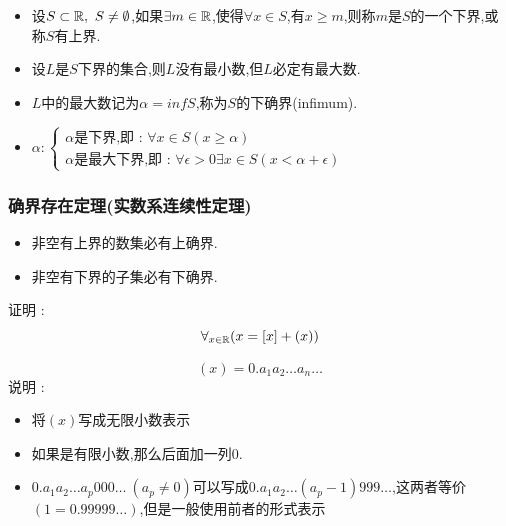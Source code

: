 {{{{\begin{itemize}
{              \begin{itemize}
                  \item 设$S \subset \operatorname{\mathbb{R}},\ S \neq \emptyset$,如果$\exists m \in \operatorname{\mathbb{R}}$,使得$\forall x \in S$,有$x \geq m$,则称$m$是$S$的一个下界,或称$S$有上界.
                  \item 设$L$是$S$下界的集合,则$L$没有最小数,但$L$必定有最大数.
                  \item $L$中的最大数记为$\alpha = inf S$,称为$S$的下确界(infimum).
                  \item {
                        \(
                        \alpha : \begin{cases}
                            \alpha\mbox{是下界,即 : }\forall x \in S(x \geq \alpha) \\
                            \alpha\mbox{是最大下界,即 : }\forall \epsilon > 0 \exists x \in S (x < \alpha + \epsilon)
                        \end{cases}
                        \)
                        }
              \end{itemize}
              }
    \end{itemize}
}%

\subsubsection{确界存在定理(实数系连续性定理)}{
\begin{itemize}
    \item 非空有上界的数集必有上确界.
    \item 非空有下界的子集必有下确界.
\end{itemize}

证明 : $$
    \forall_{x \in \operatorname{\mathbb{R}}} (x = [x] + (x))
$$

$$
    (x) = 0.a_1 a_2 \dots a_n \dots
$$
说明 :
\begin{itemize}
    \item 将$(x)$写成无限小数表示
    \item 如果是有限小数,那么后面加一列0.
    \item $0.a_1a_2 \dots a_p 000\dots\ (a_p \neq 0)$可以写成$0.a_1a_2 \dots (a_p-1)999\dots$,这两者等价$(1 = 0.99999\dots)$,但是一般使用前者的形式表示
\end{itemize}

}}}}
